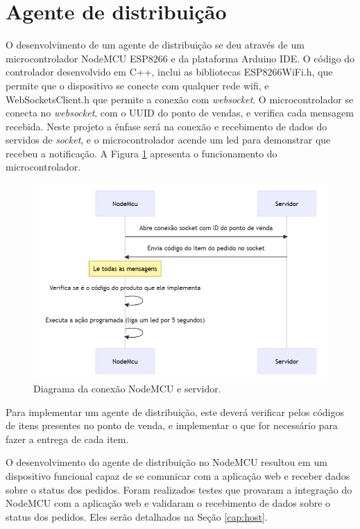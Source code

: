 \section{Agente de distribuição} \label{cap:agent}

O desenvolvimento de um agente de distribuição se deu através de um microcontrolador NodeMCU ESP8266 e da plataforma Arduino IDE. O código do controlador desenvolvido em C++, inclui as bibliotecas ESP8266WiFi.h, que permite que o dispositivo se conecte com qualquer rede wifi, e WebSocketsClient.h que permite a conexão com \textit{websocket}. O microcontrolador se conecta no \textit{websocket}, com o UUID do ponto de vendas, e verifica cada mensagem recebida. Neste projeto a ênfase será na conexão e recebimento de dados do servidos de \textit{socket}, e o microcontrolador acende um led para demonstrar que recebeu a notificação. A Figura \ref{fig:diagrama conexao} apresenta o funcionamento do microcontrolador.

\begin{figure}
	\caption{\label{fig:diagrama conexao}Diagrama da conexão NodeMCU e servidor.}
	\begin{center}
		\includegraphics[width=\textwidth]{figuras/diagrama nodemcu.png}
	\end{center}
\end{figure}

Para implementar um agente de distribuição, este deverá verificar pelos códigos de itens presentes no ponto de venda, e implementar o que for necessário para fazer a entrega de cada item.

O desenvolvimento do agente de distribuição no NodeMCU resultou em um dispositivo funcional capaz de se comunicar com a aplicação web e receber dados sobre o status dos pedidos. Foram realizados testes que provaram a integração do NodeMCU com a aplicação web e validaram o recebimento de dados sobre o status dos pedidos. Eles serão detalhados na Seção \ref{cap:host}.

